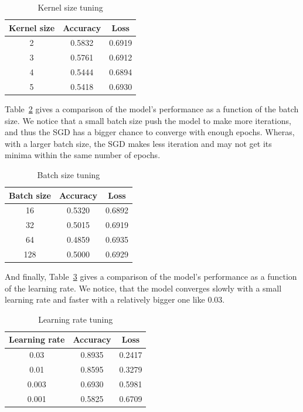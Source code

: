 \documentclass[a4paper]{article}
\begin{document}
\begin{table}[h!]
	\centering
	\begin{tabular}{||c c c||} 
		\hline
		Kernel size & Accuracy & Loss \\ [0.5ex] 
		\hline\hline
		2 & 0.5832 & 0.6919 \\ 
		3 & 0.5761 & 0.6912 \\ 
		4 & 0.5444 & 0.6894 \\ 
		5 & 0.5418 & 0.6930 \\ [1ex]  
		\hline
	\end{tabular}
	\caption{Kernel size tuning}
	\label{table:2}
\end{table}

Table~\ref{table:3} gives a comparison of the model's performance as a function of the batch size. We notice that a small batch size push the model to make more iterations, and thus the SGD has a bigger chance to converge with enough epochs. Wheras, with a larger batch size, the SGD makes less iteration and may not get its minima within the same number of epochs.
%
\begin{table}[h!]
	\centering
	\begin{tabular}{||c c c||} 
		\hline
		Batch size & Accuracy & Loss \\ [0.5ex] 
		\hline\hline
		16 & 0.5320 & 0.6892 \\ 
		32 & 0.5015 & 0.6919 \\ 
		64 & 0.4859 & 0.6935 \\ 
		128 & 0.5000 & 0.6929 \\ [1ex]  
		\hline
	\end{tabular}
	\caption{Batch size tuning}
	\label{table:3}
\end{table}

And finally, Table~\ref{table:4} gives a comparison of the model's performance as a function of the learning rate. We notice, that the model converges slowly with a small learning rate and faster with a relatively bigger one like 0.03.

\begin{table}[h!]
	\centering
	\begin{tabular}{||c c c||} 
		\hline
		Learning rate & Accuracy & Loss \\ [0.5ex] 
		\hline\hline
		0.03 & 0.8935 & 0.2417 \\ 
		0.01 & 0.8595 & 0.3279 \\ 
		0.003 & 0.6930 & 0.5981 \\
		0.001 & 0.5825 & 0.6709 \\ [1ex]  
		\hline
	\end{tabular}
	\caption{Learning rate tuning}
	\label{table:4}
\end{table}
\end{document}
